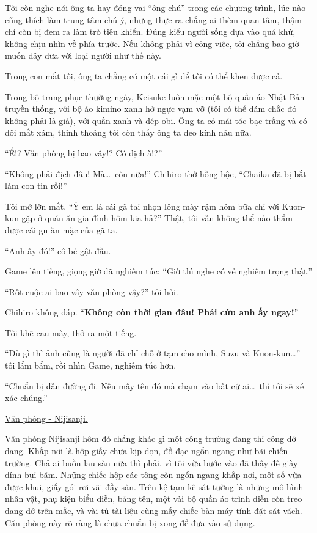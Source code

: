\documentclass[../main.tex]{subfiles}
\begin{document}
Tôi còn nghe nói ông ta hay đóng vai ``ông chú'' trong các chương trình, lúc nào cũng thích làm trung tâm chú ý, nhưng thực ra chẳng ai thèm quan tâm, thậm chí còn bị đem ra làm trò tiêu khiển. Đúng kiểu người sống dựa vào quá khứ, không chịu nhìn về phía trước. Nếu không phải vì công việc, tôi chẳng bao giờ muốn dây dưa với loại người như thế này.

Trong con mắt tôi, ông ta chẳng có một cái  gì để tôi có thể khen được cả.

Trong bộ trang phục thường ngày, Keisuke luôn mặc một bộ quần áo Nhật Bản truyền thống, với bộ áo kimino xanh hở ngực vạm vỡ (tôi có thể dám chắc đó không phải là giả), với quần xanh và dép obi. Ông ta có mái tóc bạc trắng và có đôi mắt xám, thỉnh thoảng tôi còn thấy ông ta đeo kính nâu nữa.

\chrint

``Ể!? Văn phòng bị bao vây!? Có địch à!?''

``Không phải địch đâu! Mà\dots\ còn nữa!'' Chihiro thở hồng hộc, ``Chaika đã bị bắt làm con tin rồi!''

Tôi mở lớn mắt. ``Ý em là cái gã tai nhọn lông mày rậm hôm bữa chị với Kuon-kun gặp ở quán ăn gia đình hôm kia hả?'' Thật, tôi vẫn không thể nào thẩm được cái gu ăn mặc của gã ta.

``Anh ấy đó!'' cô bé gật đầu.

Game lên tiếng, giọng giờ đã nghiêm túc: ``Giờ thì nghe có vẻ nghiêm trọng thật.''

``Rốt cuộc ai bao vây văn phòng vậy?'' tôi hỏi.

Chihiro không đáp. ``\textbf{Không còn thời gian đâu! Phải cứu anh ấy ngay!}''

Tôi khẽ cau mày, thở ra một tiếng.

``Dù gì thì ảnh cũng là người đã chỉ chỗ ở tạm cho mình, Suzu và Kuon-kun\dots'' tôi lẩm bẩm, rồi nhìn Game, nghiêm túc hơn.

``Chuẩn bị dẫn đường đi. Nếu mấy tên đó mà chạm vào bất cứ ai\dots\ thì tôi sẽ xé xác chúng.''

\begin{center}
  \uline{Văn phòng - Nijisanji.}
\end{center}

Văn phòng Nijisanji hôm đó chẳng khác gì một công trường đang thi công dở dang. Khắp nơi là hộp giấy chưa kịp dọn, đồ đạc ngổn ngang như bãi chiến trường. Chả ai buồn lau sàn nữa thì phải, vì tôi vừa bước vào đã thấy đế giày dính bụi bặm. Những chiếc hộp các-tông còn ngổn ngang khắp nơi, một số vừa được khui, giấy gói rơi vãi đầy sàn. Trên kệ tạm kê sát tường là những mô hình nhân vật, phụ kiện biểu diễn, bảng tên, một vài bộ quần áo trình diễn còn treo dang dở trên mắc, và vài tủ tài liệu cùng mấy chiếc bàn máy tính đặt sát vách. Căn phòng này rõ ràng là chưa chuẩn bị xong để đưa vào sử dụng.
\end{document}

